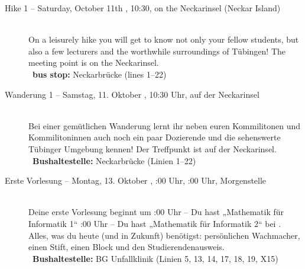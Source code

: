 \begin{description}
\ifml
	\item[Hike 1 -- Saturday, October 11th \YEAR, 10:30, on the Neckarinsel (Neckar Island)]~\\
	On a leisurely hike you will get to know not only your fellow students,
	but also a few lecturers and the worthwhile surroundings of Tübingen!
	The meeting point is on the Neckarinsel.\\
	~\textbf{bus stop:} Neckarbrücke (lines 1--22)
\else
	\item[Wanderung 1 -- Samstag, 11. Oktober \YEAR, 10:30 Uhr, auf der Neckarinsel]~\\
	Bei einer gemütlichen Wanderung lernt ihr neben euren Kommilitonen und Kommilitoninnen auch
	noch ein paar Dozierende und die sehenswerte Tübinger Umgebung kennen!
	Der Treffpunkt ist auf der Neckarinsel.\\
	~\textbf{Bushaltestelle:} Neckarbrücke (Linien 1--22)
\fi


\ifbachelor
    \item[Erste Vorlesung -- Montag, 13. Oktober \YEAR, \ifwintersemester 8:00 Uhr, \else 10:00 Uhr, \fi Morgenstelle]~\\
    Deine erste Vorlesung beginnt um
    :00 Uhr -- Du hast „Mathematik für Informatik 1“  \fi
    :00 Uhr -- Du hast „Mathematik für Informatik 2“  \fi
    bei \Matheprof.
    Alles, was du heute (und in Zukunft) benötigst: persönlichen Wachmacher, einen Stift, einen Block und den Studierendenausweis.\\
    ~\textbf{Bushaltestelle:} BG Unfallklinik (Linien 5, 13, 14, 17, 18, 19, X15)
\fi


\end{description}
